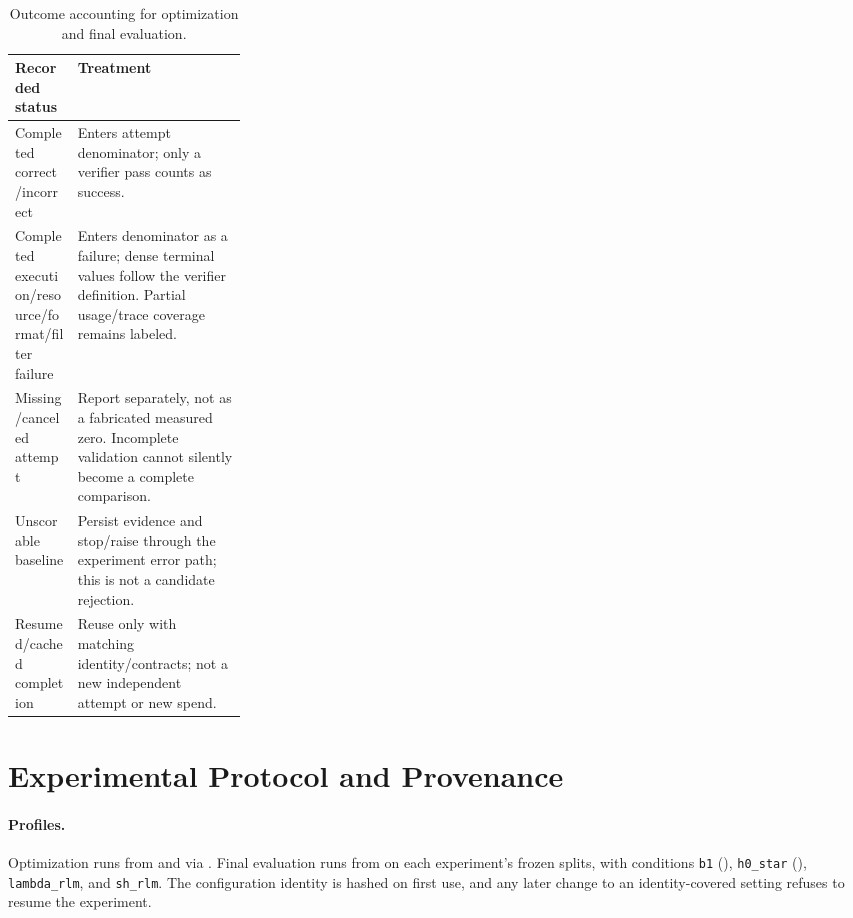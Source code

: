 \begin{table}[t]
\centering\small
\begin{tabularx}{\linewidth}{@{}p{0.27\linewidth}X@{}}
\toprule
Recorded status & Treatment \\
\midrule
Completed correct/incorrect & Enters attempt denominator; only a verifier pass counts as success. \\
Completed execution/resource/format/filter failure & Enters denominator as a failure; dense terminal values follow the verifier definition. Partial usage/trace coverage remains labeled. \\
Missing/canceled attempt & Report separately, not as a fabricated measured zero. Incomplete validation cannot silently become a complete comparison. \\
Unscorable baseline & Persist evidence and stop/raise through the experiment error path; this is not a candidate rejection. \\
Resumed/cached completion & Reuse only with matching identity/contracts; not a new independent attempt or new spend. \\
\bottomrule
\end{tabularx}
\caption{Outcome accounting for optimization and final evaluation.}
\end{table}

\section{Experimental Protocol and Provenance}
\label{app:protocol}

\paragraph{Profiles.}
Optimization runs from
 and
via . Final evaluation runs from
 on each experiment's frozen splits, with conditions
\texttt{b1} (\hzero{}), \texttt{h0\_star} (\hzerostar{}), \texttt{lambda\_rlm}, and
\texttt{sh\_rlm}. The configuration identity is hashed on first use, and any later
change to an identity-covered setting refuses to resume the experiment.

